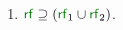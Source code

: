 \begin{multicols}{2}
\begin{enumerate}[topsep=0pt,label=(\textsc{i}\arabic*),ref=\textsc{i}\arabic*]
      \item \label{if-rf}
        ${\rrfx}\rsupset{\rrfx_1}{\rrfx_2}$.
    \end{enumerate}
  \end{multicols}
  \smallskip


